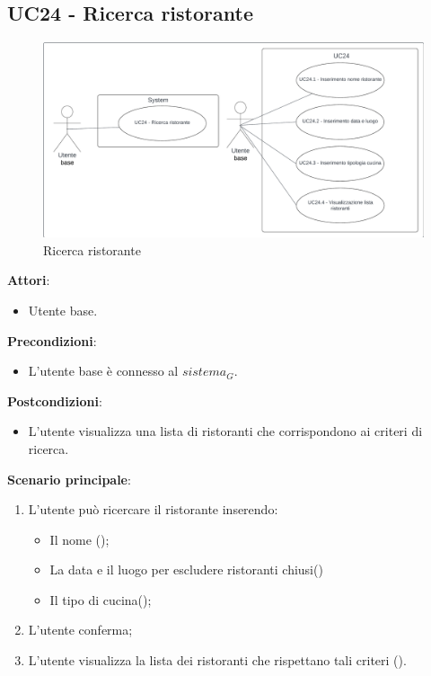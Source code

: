 \subsection{UC24 - Ricerca ristorante}\label{usecase:24}

\begin{figure}[H]
    \centering
    \includegraphics[width=0.9\linewidth]{ucd/UCD24.png}
    \caption{Ricerca ristorante}
\end{figure}

\textbf{Attori}:
\begin{itemize}
    \item Utente base.
\end{itemize}
\textbf{Precondizioni}:
\begin{itemize}
    \item L'utente base è connesso al $\textit{sistema}_G$.
\end{itemize}
\textbf{Postcondizioni}:
\begin{itemize}
    \item L'utente visualizza una lista di ristoranti che corrispondono ai criteri di ricerca.
\end{itemize}
\textbf{Scenario principale}:
\begin{enumerate}
    \item L'utente può ricercare il ristorante inserendo:
    \begin{itemize}
        \item Il nome ();
        \item La data e il luogo per escludere ristoranti chiusi()
        \item Il tipo di cucina();
    \end{itemize}
    \item L'utente conferma;
    \item L'utente visualizza la lista dei ristoranti che rispettano tali criteri ().
\end{enumerate}


